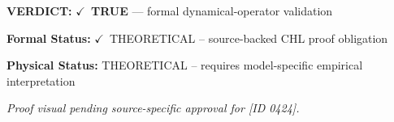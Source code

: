 \textbf{VERDICT:} \ensuremath{\checkmark}\ \textbf{TRUE} --- formal dynamical-operator validation

\textbf{Formal Status:} \ensuremath{\checkmark}\ THEORETICAL -- source-backed CHL proof obligation

\textbf{Physical Status:} THEORETICAL -- requires model-specific empirical interpretation
\par\vspace{0.45em}
\par
\vfill
\begingroup\footnotesize\itshape
Proof visual pending source-specific approval for [ID 0424].
\par\endgroup
\vfill
\endgroup
\endgroup
